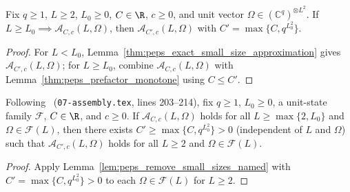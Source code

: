 \begin{lemma}
    \label{lem:peps_remove_small_sizes_named}
    \leanok
    Fix $q\ge1$, $L\ge2$, $L_0\ge0$, $C\in\R$, $c\ge0$, and unit vector
    $\Omega\in(\mathbb C^q)^{\otimes L^2}$. If
    $L\ge L_0\implies\mathcal A_{C,c}(L,\Omega)$, then
    $\mathcal A_{C',c}(L,\Omega)$ with $C'=\max\{C,q^{L_0^2}\}$.
\end{lemma}
\begin{proof}
    \leanok
    For $L<L_0$, Lemma~\ref{thm:peps_exact_small_size_approximation} gives
    $\mathcal A_{C',c}(L,\Omega)$; for $L\ge L_0$, combine
    $\mathcal A_{C,c}(L,\Omega)$ with Lemma~\ref{thm:peps_prefactor_monotone}
    using $C\le C'$.
\end{proof}

\begin{lemma}
    \label{thm:peps_remove_finite_exceptions}
    \leanok
    Following~\cite[Section~8]{OpenAI2026PolynomialPEPS}
    (\texttt{07-assembly.tex}, lines 203--214), fix $q\ge1$, $L_0\ge0$, a
    unit-state family $\mathcal F$, $C\in\R$, and $c\ge0$. If
    $\mathcal A_{C,c}(L,\Omega)$ holds for all $L\ge\max\{2,L_0\}$ and
    $\Omega\in\mathcal F(L)$, then there exists $C'\ge\max\{C,q^{L_0^2}\}>0$
    (independent of $L$ and $\Omega$) such that $\mathcal A_{C',c}(L,\Omega)$
    holds for all $L\ge2$ and $\Omega\in\mathcal F(L)$.
\end{lemma}
\begin{proof}
    \leanok
    Apply Lemma~\ref{lem:peps_remove_small_sizes_named} with
    $C'=\max\{C,q^{L_0^2}\}>0$ to each $\Omega\in\mathcal F(L)$ for $L\ge2$.
\end{proof}

